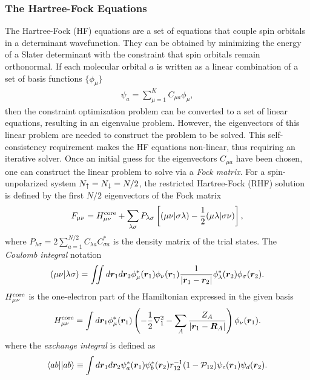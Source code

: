 \subsubsection{The Hartree-Fock Equations}
The Hartree-Fock (HF) equations are a set of equations that couple spin orbitals in a determinant wavefunction. They can be obtained by minimizing the energy of a Slater determinant with the constraint that spin orbitals remain orthonormal. If each molecular orbital $a$ is written as a linear combination of a set of basis functions $\{\phi_\mu\}$
\begin{align} \label{eq:hf-psia}
\psi_a = \sum\limits_{\mu=1}^K C_{\mu a} \phi_\mu,
\end{align}
then the constraint optimization problem can be converted to a set of linear equations, resulting in an eigenvalue problem.
However, the eigenvectors of this linear problem are needed to construct the problem to be solved.
This self-consistency requirement makes the HF equations non-linear, thus requiring an iterative solver.
Once an initial guess for the eigenvectors $C_{\mu a}$ have been chosen, one can construct the linear problem to solve via a \emph{Fock matrix}.
For a spin-unpolarized system $N_{\uparrow}=N_{\downarrow}=N/2$, the restricted Hartree-Fock (RHF) solution is defined by the first $N/2$ eigenvectors of the Fock matrix
\begin{align}
F_{\mu\nu} = H^{\text{core}}_{\mu\nu} + \sum\limits_{\lambda\sigma} P_{\lambda\sigma} \left[
(\mu\nu|\sigma\lambda) - \frac{1}{2}(\mu\lambda|\sigma\nu)
\right],
\end{align} %
where $P_{\lambda\sigma}=2\sum_{a=1}^{N/2} C_{\lambda a}C_{\sigma a}^*$ is the density matrix of the trial states. The \textit{Coulomb integral} notation
\begin{align}
(\mu\nu|\lambda\sigma) = \iint d\boldsymbol{r}_1 d\boldsymbol{r}_2 \phi_\mu^*(\boldsymbol{r}_1)\phi_{\nu}(\boldsymbol{r}_1)
\frac{1}{\vert\boldsymbol{r}_1-\boldsymbol{r}_2\vert}
\phi_\lambda^*(\boldsymbol{r}_2)\phi_\sigma(\boldsymbol{r}_2).
\end{align}
$H^{\text{core}}_{\mu\nu}$ is the one-electron part of the Hamiltonian expressed in the given basis %
\begin{align}
H^{\text{core}}_{\mu\nu} = \int d\boldsymbol{r}_1 \phi_\mu^*(\boldsymbol{r}_1)\left(
-\frac{1}{2}\nabla_1^2-\sum\limits_A \dfrac{Z_A}{\vert\boldsymbol{r}_1-\boldsymbol{R}_A\vert}
\right)  \phi_\nu(\boldsymbol{r}_1).
\end{align}
where the \textit{exchange integral} is defined as
\begin{align}
\braket{ab||ab} \equiv \int d\boldsymbol{r}_1d\boldsymbol{r}_2 \psi_a^*(\boldsymbol{r}_1)\psi_b^*(\boldsymbol{r}_2)r_{12}^{-1}(1-\mathcal{P}_{12})\psi_c(\boldsymbol{r}_1)\psi_d(\boldsymbol{r}_2).
\end{align}
